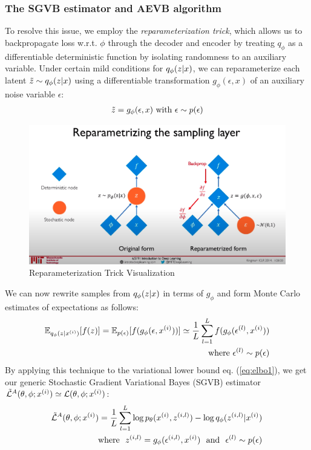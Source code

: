 \documentclass{article}
\begin{document}
\subsubsection{The SGVB estimator and AEVB algorithm}\label{reparam}
To resolve this issue, we employ the \textit{reparameterization trick}, which allows us to backpropagate loss w.r.t. $\phi$ through the decoder and encoder by treating $q_\phi$ as a differentiable deterministic function by isolating randomness to an auxiliary variable. Under certain mild conditions for $q_\phi(z|x)$, we can reparameterize each latent $\Tilde{z} \sim q_\phi(z|x)$ using a differentiable transformation $g_\phi(\epsilon,x)$ of an auxiliary noise variable $\epsilon$:
\begin{align}
    \Tilde{z} = g_\phi(\epsilon,x)~\text{with}~\epsilon \sim p(\epsilon)
\end{align}
\begin{figure}[b]
    \centering
    \includegraphics[scale=.25]{reparameterization_trick.png}
    \caption{Reparameterization Trick Visualization}
    \label{fig:reparam}
\end{figure}
We can now rewrite samples from $q_\phi(z|x)$ in terms of $g_\phi$ and form Monte Carlo estimates of expectations as follows:
\begin{align}
    \mathbb{E}_{q_\phi(z|x^{(i)})}[f(z)] = \mathbb{E}_{p(\epsilon)}[f(g_\phi(\epsilon,x^{(i)}))] \simeq \frac{1}{L}\sum^L_{l=1}f(g_\phi(\epsilon^{(l)},x^{(i)})) \notag \\
    \text{where}~\epsilon^{(l)} \sim p(\epsilon)
\end{align}
By applying this technique to the variational lower bound eq. (\ref{eq:elbo1}), we get our generic Stochastic Gradient Variational Bayes (SGVB) estimator $\tilde{\mathcal{L}}^A(\theta,\phi;x^{(i)})\simeq\mathcal{L}(\theta,\phi;x^{(i)})$:
\begin{align}
    \tilde{\mathcal{L}}^A(\theta,\phi;x^{(i)}) = \frac{1}{L}\sum_{l=1}^L\log p_\theta(x^{(i)},z^{(i,l)}) - \log q_\phi(z^{(i,l)}|x^{(i)}) \notag \\\text{~~where~~} z^{(i,l)} = g_\phi(\epsilon^{(i,l)},x^{(i)}) \text{~~and~~} \epsilon^{(l)}\sim p(\epsilon)
\end{align}
\end{document}
